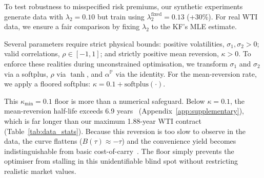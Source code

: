 \documentclass[11pt, a4paper]{article}
\begin{document}
To test robustness to misspecified risk premiums, our synthetic experiments generate data with $\lambda_2 = 0.10$ but train using $\lambda_2^{\text{fixed}} = 0.13$ (+30\%). For real WTI data, we ensure a fair comparison by fixing $\lambda_2$ to the KF's MLE estimate.

Several parameters require strict physical bounds: positive volatilities, $\sigma_1, \sigma_2 > 0$; valid correlations, $\rho \in [-1, 1]$; and strictly positive mean reversion, $\kappa > 0$. To enforce these realities during unconstrained optimisation, we transform $\sigma_1$ and $\sigma_2$ via a softplus, $\rho$ via $\tanh$, and $\alpha^{\mathbb{P}}$ via the identity. For the mean-reversion rate, we apply a floored softplus: $\kappa = 0.1 + \mathrm{softplus}(\cdot)$.

This $\kappa_{\min} = 0.1$ floor is more than a numerical safeguard. Below $\kappa = 0.1$, the mean-reversion half-life exceeds 6.9 years~\cite{uhlenbeck1930theory} (Appendix~\ref{app:supplementary}), which is far longer than our maximum 1.88-year WTI contract (Table~\ref{tab:data_stats}). Because this reversion is too slow to observe in the data, the curve flattens ($B(\tau) \approx -\tau$) and the convenience yield becomes indistinguishable from basic cost-of-carry~\cite{cox1981relation}. The floor simply prevents the optimiser from stalling in this unidentifiable blind spot without restricting realistic market values.

\end{document}
